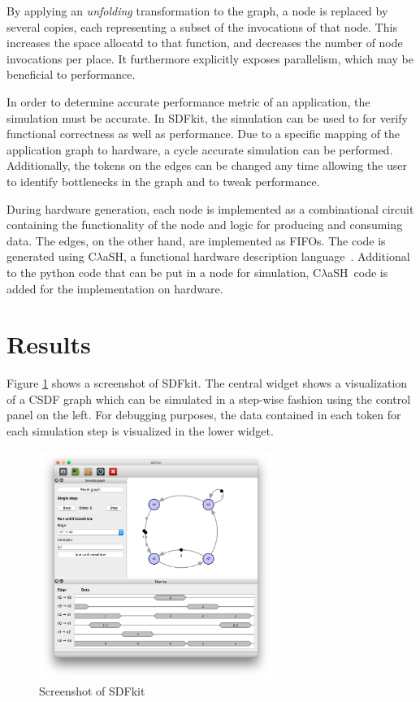 \documentclass[journal]{IEEEtran}
\newcommand{\clash}{C$\lambda$aSH}
\begin{document}
  By applying an \emph{unfolding} transformation to the graph, a node is replaced by several copies, each representing a subset of the invocations of that node.
  This increases the space allocatd to that function, and decreases the number of node invocations per place.
  It furthermore explicitly exposes parallelism, which may be beneficial to performance.
  
  In order to determine accurate performance metric of an application, the simulation must be accurate.
  In SDFkit, the simulation can be used to for verify functional correctness as well as performance.
  Due to a specific mapping of the application graph to hardware, a cycle accurate simulation can be performed.
  Additionally, the tokens on the edges can be changed any time allowing the user to identify bottlenecks in the graph and to tweak performance.
  
  During hardware generation, each node is implemented as a combinational circuit containing the functionality of the node and logic for producing and consuming data.
  The edges, on the other hand, are implemented as FIFOs.
  The code is generated using \clash, a functional hardware description language~\cite{Baaij10}.
  Additional to the python code that can be put in a node for simulation, \clash\ code is added for the implementation on hardware.


\section{Results}
\label{sec:results}


  Figure \ref{fig:screenshot} shows a screenshot of SDFkit.
  The central widget shows a visualization of a CSDF graph which can be simulated in a step-wise fashion using the control panel on the left.
  For debugging purposes, the data contained in each token for each simulation step is visualized in the lower widget.

  \begin{figure}[h!]
    \centering
    \includegraphics[width=3in]{screenshot.png}
    \caption{Screenshot of SDFkit}
    \label{fig:screenshot}
  \end{figure}
\end{document}
